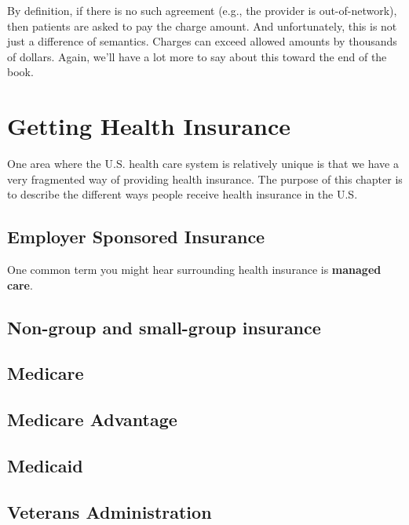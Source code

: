 \documentclass[
  letterpaper,
  DIV=11,
  numbers=noendperiod]{scrreport}
\theoremstyle{definition}
\theoremstyle{remark}
\begin{document}
By definition, if there is no such agreement (e.g., the provider is
out-of-network), then patients are asked to pay the charge amount. And
unfortunately, this is not just a difference of semantics. Charges can
exceed allowed amounts by thousands of dollars. Again, we'll have a lot
more to say about this toward the end of the book.

\hypertarget{getting-health-insurance}{%
\chapter{Getting Health Insurance}\label{getting-health-insurance}}

One area where the U.S. health care system is relatively unique is that
we have a very fragmented way of providing health insurance. The purpose
of this chapter is to describe the different ways people receive health
insurance in the U.S.

\hypertarget{employer-sponsored-insurance}{%
\section{Employer Sponsored
Insurance}\label{employer-sponsored-insurance}}

One common term you might hear surrounding health insurance is
\textbf{managed care}.

\hypertarget{non-group-and-small-group-insurance}{%
\section{Non-group and small-group
insurance}\label{non-group-and-small-group-insurance}}

\hypertarget{medicare}{%
\section{Medicare}\label{medicare}}

\hypertarget{medicare-advantage}{%
\section{Medicare Advantage}\label{medicare-advantage}}

\hypertarget{medicaid}{%
\section{Medicaid}\label{medicaid}}

\hypertarget{veterans-administration}{%
\section{Veterans Administration}\label{veterans-administration}}
\end{document}
